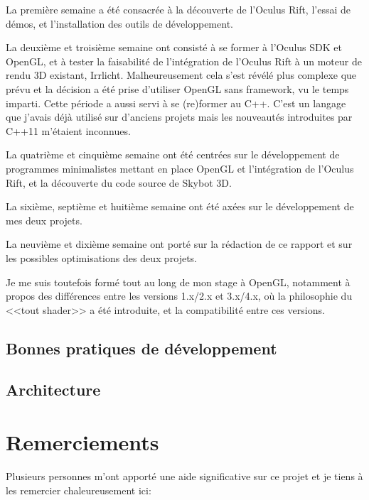 \documentclass[a4paper,french,12pt]{article}
\begin{document}
		La première semaine a été consacrée à la découverte de l'Oculus Rift, l'essai de démos, et l'installation
		des outils de développement.
		
		La deuxième et troisième semaine ont consisté à se former à l'Oculus SDK et OpenGL, et à tester la
		faisabilité de l'intégration de l'Oculus Rift à un moteur de rendu 3D existant, Irrlicht. Malheureusement 
		cela s'est révélé plus complexe que prévu et la décision a été prise d'utiliser OpenGL sans framework,
		vu le temps imparti.
		Cette période a aussi servi à se (re)former au C++. C'est un langage que j'avais déjà utilisé sur d'anciens
		projets mais les nouveautés introduites par C++11 m'étaient inconnues.
		
		La quatrième et cinquième semaine ont été centrées sur le développement de programmes minimalistes mettant
		en place OpenGL et l'intégration de l'Oculus Rift, et la découverte du code source de Skybot 3D.
		
		La sixième, septième et huitième semaine ont été axées sur le développement de mes deux projets.
		
		La neuvième et dixième semaine ont porté sur la rédaction de ce rapport et sur les possibles optimisations
		des deux projets.
				
		Je me suis toutefois formé tout au long de mon stage à OpenGL, notamment à propos
		des différences entre les versions 1.x/2.x et 3.x/4.x, où la philosophie du <<tout shader>> a été introduite,
		et la compatibilité entre ces versions.
		
		
	
	\subsection{Bonnes pratiques de développement}
	
	\subsection{Architecture}
	

			
\section{Remerciements}

	Plusieurs personnes m’ont apporté une aide significative sur ce projet et je tiens à les remercier chaleureusement ici: 
\end{document}
